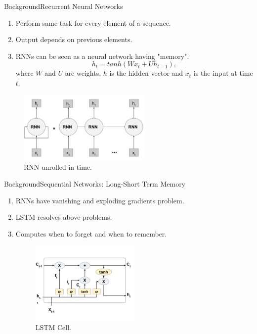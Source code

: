 \documentclass[handout]{beamer}
\begin{document}
\begin{frame}{Background}{Recurrent Neural Networks}
  \begin{enumerate}
    \item Perform same task for every element of a sequence.
    \item Output depends on previous elements.
    \item RNNs can be seen as a neural network having "memory".
    \begin{equation}
        h_t = tanh(Wx_t+Uh_{t-1}),
    \end{equation}
    where $W$ and $U$ are weights, $h$ is the hidden vector and $x_t$ is the input at time $t$.
  \end{enumerate}
  \begin{center}
    \begin{figure}
    \includegraphics[width=0.6\linewidth, height=3.5cm]{images/RNN}
    \caption{RNN unrolled in time.}
    \end{figure}
  \end{center}
\end{frame}

\begin{frame}{Background}{Sequential Networks: Long-Short Term Memory}
  \begin{enumerate}
    \item RNNs have vanishing and exploding gradients problem.
    \item LSTM resolves above problems.
    \item Computes when to forget and when to remember.
    \begin{center}
      \begin{figure}
      \includegraphics[width=0.6\linewidth, height=4cm]{images/lstm}
      \caption{LSTM Cell.}
      \end{figure}
    \end{center}
  \end{enumerate}
\end{frame}
\end{document}
